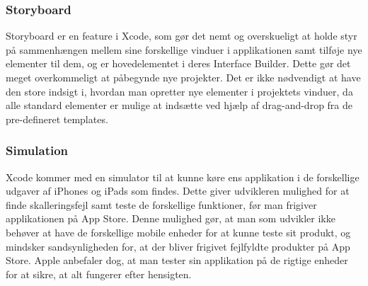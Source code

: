 \documentclass[a4paper,10pt,titlepage]{article}
\begin{document}
\subsubsection{Storyboard}
Storyboard er en feature i Xcode, som gør det nemt og overskueligt at holde styr på sammenhængen mellem sine forskellige vinduer i applikationen samt tilføje nye elementer til dem, og er hovedelementet i deres Interface Builder. Dette gør det meget overkommeligt at påbegynde nye projekter. Det er ikke nødvendigt at have den store indsigt i, hvordan man opretter nye elementer i projektets vinduer, da alle standard elementer er mulige at indsætte ved hjælp af drag-and-drop fra de pre-defineret templates.
\subsubsection{Simulation}
Xcode kommer med en simulator til at kunne køre ens applikation i de forskellige udgaver af iPhones og iPads som findes. Dette giver udvikleren mulighed for at finde skalleringsfejl samt teste de forskellige funktioner, før man frigiver applikationen på App Store. Denne mulighed gør, at man som udvikler ikke behøver at have de forskellige mobile enheder for at kunne teste sit produkt, og mindsker sandsynligheden for, at der bliver frigivet fejlfyldte produkter på App Store. Apple anbefaler dog, at man tester sin applikation på de rigtige enheder for at sikre, at alt fungerer efter hensigten.
\end{document}
